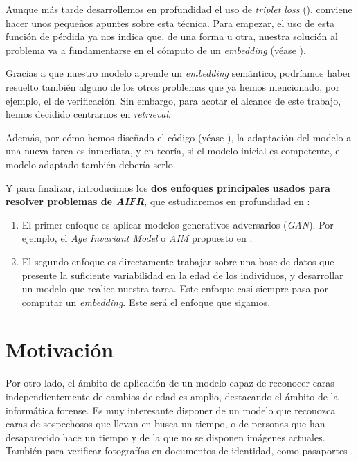 Aunque más tarde desarrollemos en profundidad el uso de \textit{triplet loss} (), conviene hacer unos pequeños apuntes sobre esta técnica. Para empezar, el uso de esta función de pérdida ya nos indica que, de una forma u otra, nuestra solución al problema va a fundamentarse en el cómputo de un \textit{embedding} (véase ).

Gracias a que nuestro modelo aprende un \textit{embedding} semántico, podríamos haber resuelto también alguno de los otros problemas que ya hemos mencionado, por ejemplo, el de verificación. Sin embargo, para acotar el alcance de este trabajo, hemos decidido centrarnos en \textit{retrieval}.

Además, por cómo hemos diseñado el código (véase ), la adaptación del modelo a una nueva tarea es inmediata, y en teoría, si el modelo inicial es competente, el modelo adaptado también debería serlo.

Y para finalizar, introducimos los \textbf{dos enfoques principales usados para resolver problemas de \textit{AIFR}}, que estudiaremos en profundidad en :

\begin{enumerate}
    \item El primer enfoque es aplicar modelos generativos adversarios (\textit{GAN}). Por ejemplo, el \textit{Age Invariant Model} o \textit{AIM} propuesto en \cite{informatica:tecnica_sintesis_aifr}.
    \item El segundo enfoque es directamente trabajar sobre una base de datos que presente la suficiente variabilidad en la edad de los individuos, y desarrollar un modelo que realice nuestra tarea. Este enfoque casi siempre pasa por computar un \textit{embedding}. Este será el enfoque que sigamos.
\end{enumerate}

\section{Motivación}

Por otro lado, el ámbito de aplicación de un modelo capaz de reconocer caras independientemente de cambios de edad es amplio, destacando el ámbito de la informática forense. Es muy interesante disponer de un modelo que reconozca caras de sospechosos que llevan en busca un tiempo, o de personas que han desaparecido hace un tiempo y de la que no se disponen imágenes actuales. También para verificar fotografías en documentos de identidad, como pasaportes \cite{informatica:tecnica_sintesis_aifr}.

